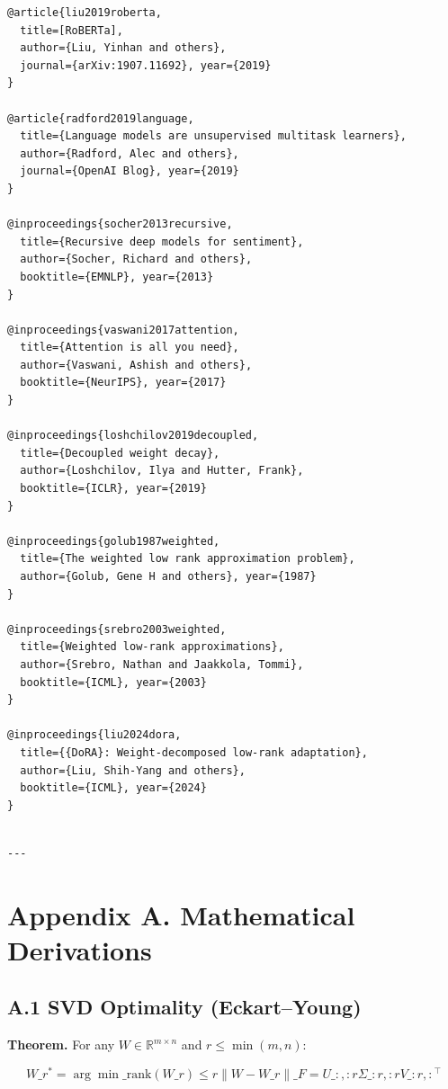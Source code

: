 \begin{lstlisting}
@article{liu2019roberta,
  title=[RoBERTa],
  author={Liu, Yinhan and others},
  journal={arXiv:1907.11692}, year={2019}
}

@article{radford2019language,
  title={Language models are unsupervised multitask learners},
  author={Radford, Alec and others},
  journal={OpenAI Blog}, year={2019}
}

@inproceedings{socher2013recursive,
  title={Recursive deep models for sentiment},
  author={Socher, Richard and others},
  booktitle={EMNLP}, year={2013}
}

@inproceedings{vaswani2017attention,
  title={Attention is all you need},
  author={Vaswani, Ashish and others},
  booktitle={NeurIPS}, year={2017}
}

@inproceedings{loshchilov2019decoupled,
  title={Decoupled weight decay},
  author={Loshchilov, Ilya and Hutter, Frank},
  booktitle={ICLR}, year={2019}
}

@inproceedings{golub1987weighted,
  title={The weighted low rank approximation problem},
  author={Golub, Gene H and others}, year={1987}
}

@inproceedings{srebro2003weighted,
  title={Weighted low-rank approximations},
  author={Srebro, Nathan and Jaakkola, Tommi},
  booktitle={ICML}, year={2003}
}

@inproceedings{liu2024dora,
  title={{DoRA}: Weight-decomposed low-rank adaptation},
  author={Liu, Shih-Yang and others},
  booktitle={ICML}, year={2024}
}
\end{lstlisting}
\begin{lstlisting}

---
\end{lstlisting}


\section{Appendix A. Mathematical Derivations}

\subsection{A.1 SVD Optimality (Eckart--Young)}

\textbf{Theorem.} For any $W \in \mathbb{R}^{m \times n}$ and $r \leq \min(m, n)$:

\[
W\_r^* = \arg\min\_{\text{rank}(W\_r) \leq r} \|W - W\_r\|\_F = U\_{:, :r} \Sigma\_{:r, :r} V\_{:r, :}^\top
\tag{A.1}
\]

